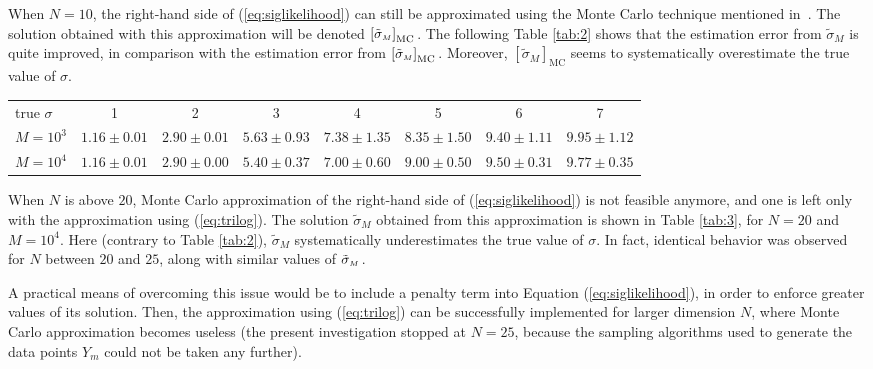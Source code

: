 \documentclass[draftclsnofoot]{IEEEtran}
\begin{document}
When $N = 10$, the right-hand side of (\ref{eq:siglikelihood}) can still be approximated using the Monte Carlo technique mentioned in~\cite{Sa16}\cite{Sa17}. The solution obtained with this approximation will be denoted $\left[\tilde{\sigma}_{\scriptscriptstyle M}\right]_{\mathrm{MC}}\hspace{0.03cm}$. The following Table \ref{tab:2} shows that the estimation error from $\tilde{\sigma}_{\scriptscriptstyle M}$ is quite improved, in comparison with the estimation error from $\left[\tilde{\sigma}_{\scriptscriptstyle M}\right]_{\mathrm{MC}}\hspace{0.03cm}$. Moreover, $\left[\tilde{\sigma}_{\scriptscriptstyle M}\right]_{\mathrm{MC}}$ seems to systematically overestimate the true value of $\sigma$.
 \begin{table*}[h]
 \centering
    \begin{tabular}{lccccccc}
    \hline
    true $\sigma$ & 1 & 2 & 3 & 4 & 5 & 6 & 7 \\[0.2cm]
    
   $M = 10^3$     & $ 1.16 \pm 0.01$ & $2.90 \pm 0.01$ & $5.63 \pm 0.93$ & $ 7.38 \pm 1.35$ & $ 8.35 \pm 1.50 $ & $9.40 \pm 1.11$ & $9.95 \pm 1.12$ \\[0.2cm]
   $M = 10^4$     & $1.16 \pm 0.01$ & $2.90 \pm 0.00$ & $5.40 \pm 0.37$ & $7.00 \pm 0.60$ & $ 9.00 \pm 0.50$ & $9.50  \pm 0.31$ & $9.77 \pm 0.35$ \\[0.1cm]
 \hline
\end{tabular} 
    \caption{The solution $\left[\tilde{\sigma}_{\scriptscriptstyle M}\right]_{\mathrm{MC}}$ of (\ref{eq:siglikelihood}), for $\beta = 1$ and $N = 10$ (MC approximation of r.h.s.)}
    \label{tab:2}   
\end{table*}   

When $N$ is above $20$, Monte Carlo approximation of the right-hand side of (\ref{eq:siglikelihood}) is not feasible anymore, and one is left only with the approximation using (\ref{eq:trilog}). The solution $\tilde{\sigma}_{\scriptscriptstyle M}$ obtained from this approximation is shown in Table \ref{tab:3}, for $N = 20$ and $M = 10^4$. Here (contrary to Table \ref{tab:2}), $\tilde{\sigma}_{\scriptscriptstyle M}$ systematically underestimates the true value of $\sigma$. In fact, identical behavior was observed for $N$ between $20$ and $25$, along with similar values of $\tilde{\sigma}_{\scriptscriptstyle M}\hspace{0.03cm}$. 

A practical means of overcoming this issue would be to include a penalty term into Equation (\ref{eq:siglikelihood}), in order to enforce greater values of its solution. Then, the approximation using (\ref{eq:trilog}) can be successfully implemented for larger dimension $N$, where Monte Carlo approximation becomes useless (the present investigation stopped at $N = 25$, because the sampling algorithms used to generate the data points $Y_{\scriptscriptstyle m}$ could not be taken any further). 
\end{document}
